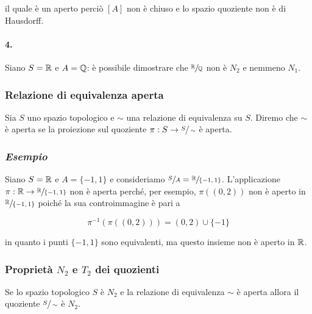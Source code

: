 il quale è un aperto perciò $ [A] $ non è chiuso e lo spazio quoziente non è di Hausdorff.

\paragraph{4.}

Siano $ S = \mathbb{R} $ e $ A = \mathbb{Q} $: è possibile dimostrare che $ \sfrac{\mathbb{R}}{\mathbb{Q}} $ non è $ N_{2} $ e nemmeno $ N_{1} $.

\subsubsection{Relazione di equivalenza aperta}

Sia $ S $ uno spazio topologico e $ \sim $ una relazione di equivalenza su $ S $. Diremo che $ \sim $ è aperta se la proiezione sul quoziente $ \pi : S \to \sfrac{S}{\sim} $ è aperta.

\subsubsection{\textit{Esempio}}

Siano $ S = \mathbb{R} $ e $ A = \{-1,1\} $ e consideriamo $ \sfrac{S}{A} = \sfrac{\mathbb{R}}{\{-1,1\}} $. L'applicazione $ \pi : \mathbb{R} \to \sfrac{\mathbb{R}}{\{-1,1\}} $ non è aperta perché, per esempio, $ \pi((0,2)) $ non è aperto in $ \sfrac{\mathbb{R}}{\{-1,1\}} $ poiché la sua controimmagine è pari a

\begin{equation}
	\pi^{-1}(\pi((0,2))) = (0,2) \cup \{-1\}
\end{equation}

in quanto i punti $ \{-1,1\} $ sono equivalenti, ma questo insieme non è aperto in $ \mathbb{R} $.

\subsubsection{Proprietà $ N_{2} $ e $ T_{2} $ dei quozienti}

\begin{definition}\label{prop-n2}
	Se lo spazio topologico $ S $ è $ N_{2} $ e la relazione di equivalenza $ \sim $ è aperta allora il quoziente $ \sfrac{S}{\sim} $ è $ N_{2} $.
\end{definition}

